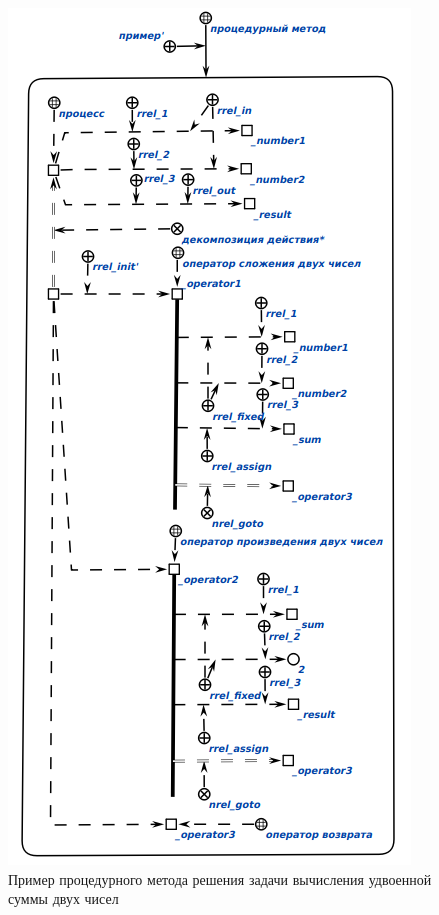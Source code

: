 \begin{figure}[htbp]  
  \center
  \includegraphics[scale=0.6]{author/part3/figures/procedural_program.png}
  \caption{Пример процедурного метода решения задачи вычисления удвоенной суммы двух чисел}
  \label{fig:procedural_program}
\end{figure}

